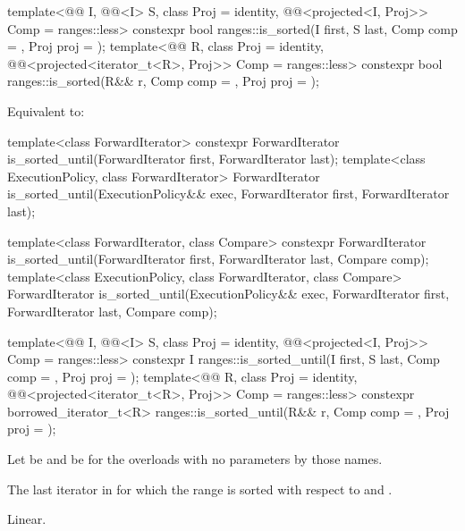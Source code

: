 %
\begin{itemdecl}
template<@@ I, @@<I> S, class Proj = identity,
         @@<projected<I, Proj>> Comp = ranges::less>
  constexpr bool ranges::is_sorted(I first, S last, Comp comp = {}, Proj proj = {});
template<@@ R, class Proj = identity,
         @@<projected<iterator_t<R>, Proj>> Comp = ranges::less>
  constexpr bool ranges::is_sorted(R&& r, Comp comp = {}, Proj proj = {});
\end{itemdecl}

\begin{itemdescr}
\pnum
\effects
Equivalent to:
\end{itemdescr}

%
\begin{itemdecl}
template<class ForwardIterator>
  constexpr ForwardIterator
    is_sorted_until(ForwardIterator first, ForwardIterator last);
template<class ExecutionPolicy, class ForwardIterator>
  ForwardIterator
    is_sorted_until(ExecutionPolicy&& exec,
                    ForwardIterator first, ForwardIterator last);

template<class ForwardIterator, class Compare>
  constexpr ForwardIterator
    is_sorted_until(ForwardIterator first, ForwardIterator last,
                    Compare comp);
template<class ExecutionPolicy, class ForwardIterator, class Compare>
  ForwardIterator
    is_sorted_until(ExecutionPolicy&& exec,
                    ForwardIterator first, ForwardIterator last,
                    Compare comp);

template<@@ I, @@<I> S, class Proj = identity,
         @@<projected<I, Proj>> Comp = ranges::less>
  constexpr I ranges::is_sorted_until(I first, S last, Comp comp = {}, Proj proj = {});
template<@@ R, class Proj = identity,
         @@<projected<iterator_t<R>, Proj>> Comp = ranges::less>
  constexpr borrowed_iterator_t<R>
    ranges::is_sorted_until(R&& r, Comp comp = {}, Proj proj = {});
\end{itemdecl}

\begin{itemdescr}
\pnum
Let  be 
and  be 
for the overloads with no parameters by those names.

\pnum
\returns
The last iterator  in 
for which the range 
is sorted with respect to  and .

\pnum
\complexity
Linear.
\end{itemdescr}

